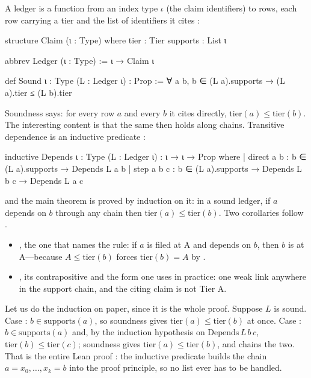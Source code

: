 A ledger is a function from an index type $\iota$ (the claim identifiers) to rows, each row
carrying a tier and the list of identifiers it cites :
\begin{leancode}
structure Claim (ι : Type) where
  tier : Tier
  supports : List ι

abbrev Ledger (ι : Type) := ι → Claim ι

def Sound {ι : Type} (L : Ledger ι) : Prop :=
  ∀ a b, b ∈ (L a).supports → (L a).tier ≤ (L b).tier
\end{leancode}
Soundness says: for every row $a$ and every $b$ it cites directly, $\text{tier}(a)\le
\text{tier}(b)$. The interesting content is that the same then holds along chains.
Transitive dependence is an inductive predicate :
\begin{leancode}
inductive Depends {ι : Type} (L : Ledger ι) : ι → ι → Prop where
  | direct {a b} : b ∈ (L a).supports → Depends L a b
  | step {a b c} : b ∈ (L a).supports → Depends L b c → Depends L a c
\end{leancode}
and the main theorem is proved by induction on it: in a sound ledger, if $a$ depends on $b$
through any chain then $\text{tier}(a)\le\text{tier}(b)$. Two corollaries follow
.
\begin{itemize}[leftmargin=*,itemsep=1pt]
\item {}, the one that names the rule: if $a$ is
  filed at A and depends on $b$, then $b$ is at A---because $A\le\text{tier}(b)$ forces
  $\text{tier}(b)=A$ by .
\item {}, its contrapositive and the form one uses in
  practice: one weak link anywhere in the support chain, and the citing claim is not Tier A.
\end{itemize}

Let us do the induction on paper, since it is the whole proof. Suppose $L$ is sound. Case
: $b\in\text{supports}(a)$, so soundness gives $\text{tier}(a)\le\text{tier}(b)$
at once. Case : $b\in\text{supports}(a)$ and, by the induction hypothesis on
$\text{Depends}\,L\,b\,c$, $\text{tier}(b)\le\text{tier}(c)$; soundness gives
$\text{tier}(a)\le\text{tier}(b)$, and  chains the two. That is the
entire Lean proof : the inductive predicate builds the
chain $a=x_0,\ldots,x_k=b$ into the proof principle, so no list ever has to be handled.

